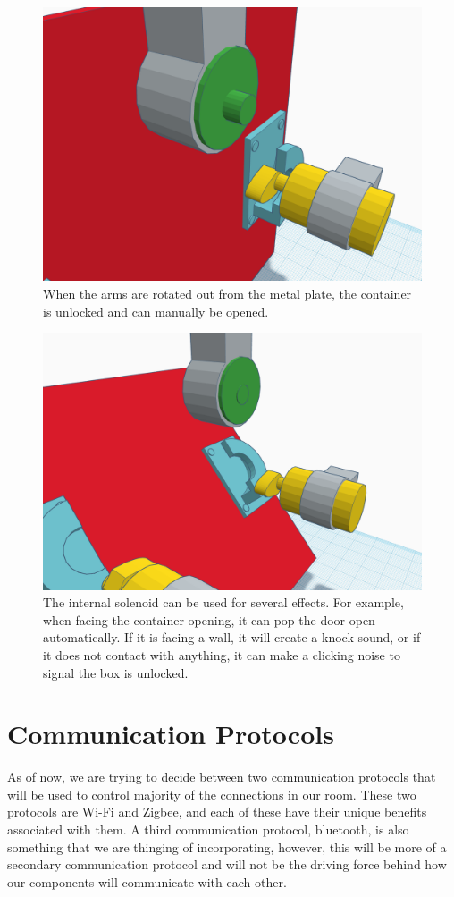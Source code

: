 \documentclass[conference]{IEEEtran}
\begin{document}
\begin{figure}[H]
    \centering
    \includegraphics[width=0.85\columnwidth]{Images/OpenLock.png}
    \caption{When the arms are rotated out from the metal plate, the container is unlocked and can manually be opened.}
\end{figure}

\begin{figure}[H]
    \centering
    \includegraphics[width=0.85\columnwidth]{Images/OpenContainer.png}
    \caption{The internal solenoid can be used for several effects. For example, when facing the container opening, it can pop the
        door open automatically. If it is facing a wall, it will create a knock sound, or if it does not contact with anything, it can
        make a clicking noise to signal the box is unlocked.}
\end{figure}
 
\section{Communication Protocols}
As of now, we are trying to decide between two communication protocols that will be used
to control majority of the connections in our room. These two protocols are Wi-Fi and Zigbee,
and each of these have their unique benefits associated with them. A third communication
protocol, bluetooth, is also something that we are thinging of incorporating, however, this
will be more of a secondary communication protocol and will not be the driving force behind
how our components will communicate with each other.
\end{document}

